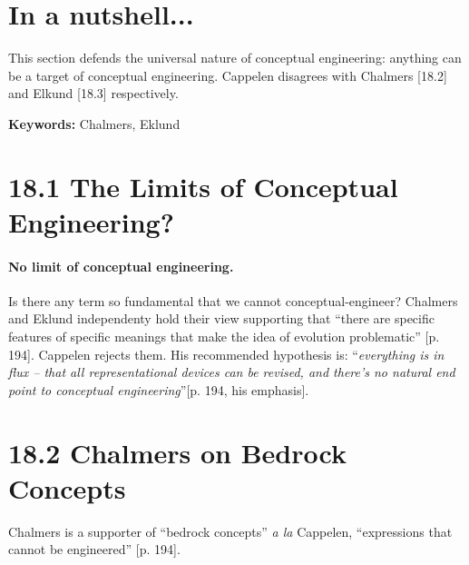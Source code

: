 \documentclass[
10pt, %
a4paper, %
twocolumn, %
landscape %
]{article}
\begin{document}
\pagestyle{myheadings} %
\markright{\doctitle} %


\thispagestyle{plain} %

\printtitle %


\section*{In a nutshell... }
This section defends the universal nature of conceptual engineering: anything can be
a target of conceptual engineering.
Cappelen disagrees with Chalmers [18.2] and Elkund [18.3] respectively.

\noindent \textbf{Keywords:} Chalmers, Eklund

\section*{18.1 The Limits of Conceptual Engineering?}
\paragraph{No limit of conceptual engineering. }
Is there any term so fundamental that we cannot conceptual-engineer?
Chalmers and Eklund independenty hold their view supporting that
``there are specific features of specific meanings that make
the idea of evolution problematic'' [p. 194].
Cappelen rejects them.
His recommended hypothesis is: ``\emph{everything is in flux -- that all representational devices
can be revised, and there's no natural end point to conceptual engineering}''[p. 194, his emphasis].

\section*{18.2 Chalmers on Bedrock Concepts}
Chalmers is a supporter of ``bedrock concepts'' \textit{a la} Cappelen, ``expressions that cannot be engineered'' [p. 194].
\end{document}

